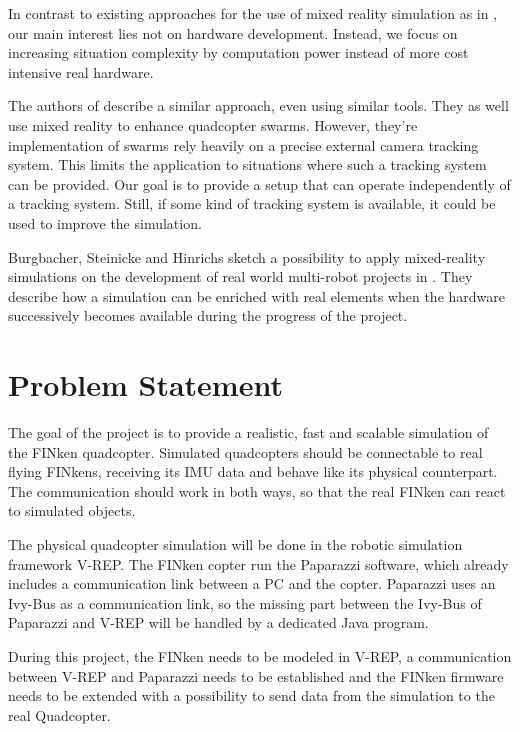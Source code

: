 In contrast to existing approaches for the use of mixed reality simulation as in \cite{Chen2011}, our main interest lies not on hardware development.
Instead, we focus on increasing situation complexity by computation power instead of more cost intensive real hardware.

The authors of  \cite{Honig2015} describe a similar approach, even using similar tools. 
They as well use mixed reality to enhance quadcopter swarms.
However, they're implementation of swarms rely heavily on a precise external camera tracking system. 
This limits the application to situations where such a tracking system can be provided.
Our goal is to provide a setup that can operate independently of a tracking system.
Still, if some kind of tracking system is available, it could be used to improve the simulation.

Burgbacher, Steinicke and Hinrichs sketch a possibility to apply mixed-reality simulations on the development of real world multi-robot projects in \cite{Burgbacher2011}.
They describe how a simulation can be enriched with real elements when the hardware successively becomes available during the progress of the project.


       


  
\section{Problem Statement}
\label{sec:problem}
    The goal of the project is to provide a realistic, fast and scalable simulation of the FINken quadcopter.  
    Simulated quadcopters should be connectable to real flying FINkens, receiving its    
    \gls{IMU} data and behave like its physical counterpart. 
    The communication should work in both ways, so that the real FINken can react to simulated objects.

The physical quadcopter simulation will be done in the robotic simulation framework V-REP\cite{vrep}. 
The FINken copter run the Paparazzi\cite{pprz} software, which already includes a communication link between a PC and the copter. 
Paparazzi uses an Ivy-Bus as a communication link, so the missing part between the Ivy-Bus of Paparazzi and V-REP will be handled by a dedicated Java program.

During this project, the FINken needs to be modeled in V-REP, a communication between V-REP and Paparazzi needs to be established and the FINken firmware needs to be extended with a possibility to send data from the simulation to the real Quadcopter.
 
